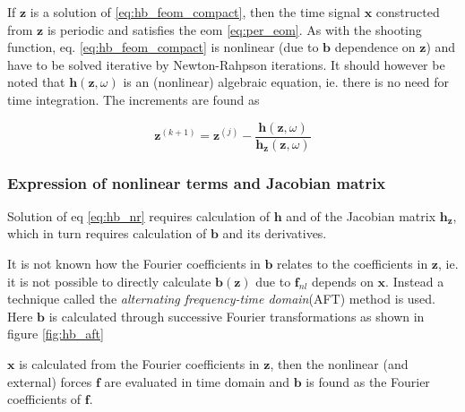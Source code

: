 If $\bm z$ is a solution of \eqref{eq:hb_feom_compact}, then the time signal
$\bm x$ constructed from $\bm z$ is periodic and satisfies the eom
\eqref{eq:per_eom}. As with the shooting function, eq.
\eqref{eq:hb_feom_compact} is nonlinear (due to $\bm b$ dependence on $\bm z$)
and have to be solved iterative by Newton-Rahpson iterations. It should
however be noted that $\bm h(\bm z, \omega)$ is an (nonlinear) algebraic
equation, ie. there is no need for time integration. The increments are found as

\begin{equation}
  \label{eq:hb_nr}
  \bm z^{(k+1)} = \bm z^{(j)} -
  \frac{\bm h(\bm z, \omega)}{\bm h_{\bm z}(\bm z, \omega)}
\end{equation}


\subsubsection{Expression of nonlinear terms and Jacobian matrix}
\label{sec:hb_exp_nonlin_jac}

Solution of eq \eqref{eq:hb_nr} requires calculation of $\bm h$ and of the
Jacobian matrix $\bm h_{\bm z}$, which in turn requires calculation of $\bm b$
and its derivatives.

It is not known how the Fourier coefficients in $\bm b$ relates to the
coefficients in $\bm z$, ie. it is not possible to directly calculate $\bm b(\bm
z)$ due to $\bm f_{nl}$ depends on $\bm x$. Instead a technique called the
\textit{alternating frequency-time domain}(AFT) method is used. Here $\bm b$ is
calculated through successive Fourier transformations as shown in figure
\ref{fig:hb_aft}

\begin{center}
\label{fig:hb_aft}
\end{center}

$\bm x$ is calculated from the Fourier coefficients in $\bm z$, then the
nonlinear (and external) forces $\bm f$ are evaluated in time domain and $\bm b$
is found as the Fourier coefficients of $\bm f$.

